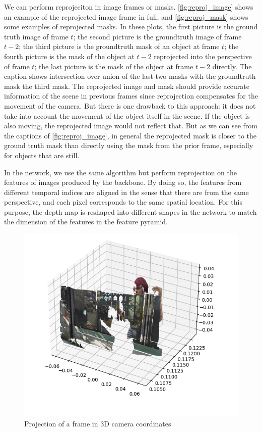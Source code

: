 We can perform reprojeciton in image frames or masks. \ref{fig:reproj_image} shows an example of the reprojected image frame in full, and \ref{fig:reproj_mask} shows some examples of reprojected masks. In these plots, the first picture is the ground truth image of frame $t$; the second picture is the groundtruth image of frame $t-2$; the third picture is the groundtruth mask of an object at frame $t$; the fourth picture is the mask of the object at $t-2$ reprojected into the perspective of frame $t$; the last picture is the mask of the object at frame $t-2$ directly. The caption shows intersection over union of the last two masks with the groundtruth mask \ie the third mask. The reprojected image and mask should provide accurate information of the scene in previous frames since reprojection compensates for the movement of the camera. But there is one drawback to this approach: it does not take into account the movement of the object itself in the scene. If the object is also moving, the reprojected image would not reflect that. But as we can see from the captions of \ref{fig:reproj_image}, in general the reprojected mask is closer to the ground truth mask than directly using the mask from the prior frame, especially for objects that are still. 

In the network, we use the same algorithm but perform reprojection on the features of images produced by the backbone. By doing so, the features from different temporal indices are aligned in the sense that there are from the same perspective, and each pixel corresponds to the same spatial location. For this purpose, the depth map is reshaped into different shapes in the network to match the dimension of the features in the feature pyramid.

\begin{figure}

\centering
\includegraphics[scale=0.5]{fig/3dproj.png}
\caption{Projection of a frame in 3D camera coordinates}
\label{fig:3Dproj}
\end{figure}


